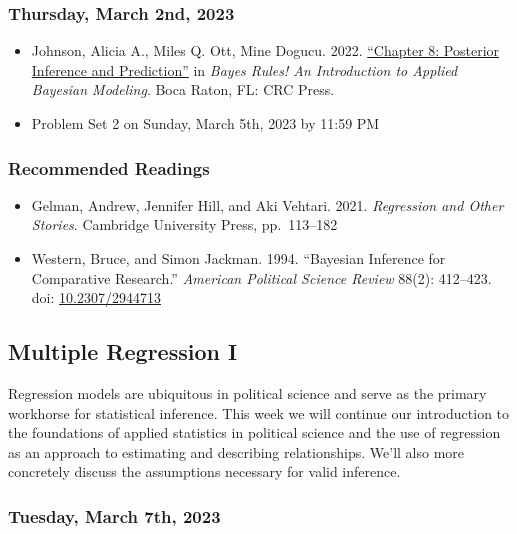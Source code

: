 \documentclass[12pt,]{article}
\begin{document}
\hypertarget{thursday-march-2nd-2023}{%
\subsubsection{Thursday, March 2nd,
2023}\label{thursday-march-2nd-2023}}

\begin{itemize}
\item
  Johnson, Alicia A., Miles Q. Ott, Mine Dogucu. 2022.
  \href{https://www.bayesrulesbook.com/chapter-8.html}{``Chapter 8:
  Posterior Inference and Prediction''} in \emph{Bayes Rules! An
  Introduction to Applied Bayesian Modeling}. Boca Raton, FL: CRC Press.
\item
  Problem Set 2 on Sunday, March 5th, 2023 by 11:59 PM
\end{itemize}

\hypertarget{recommended-readings-4}{%
\subsubsection{Recommended Readings}\label{recommended-readings-4}}

\begin{itemize}
\item
  Gelman, Andrew, Jennifer Hill, and Aki Vehtari. 2021. \emph{Regression
  and Other Stories}. Cambridge University Press, pp.~113--182
\item
  Western, Bruce, and Simon Jackman. 1994. ``Bayesian Inference for
  Comparative Research.'' \emph{American Political Science Review}
  88(2): 412--423. doi:
  \href{https://doi.org/10.2307/2944713}{10.2307/2944713}
\end{itemize}

\hypertarget{multiple-regression-i}{%
\subsection{Multiple Regression I}\label{multiple-regression-i}}

\noindent Regression models are ubiquitous in political science and
serve as the primary workhorse for statistical inference. This week we
will continue our introduction to the foundations of applied statistics
in political science and the use of regression as an approach to
estimating and describing relationships. We'll also more concretely
discuss the assumptions necessary for valid inference.

\hypertarget{tuesday-march-7th-2023}{%
\subsubsection{Tuesday, March 7th, 2023}\label{tuesday-march-7th-2023}}
\end{document}
